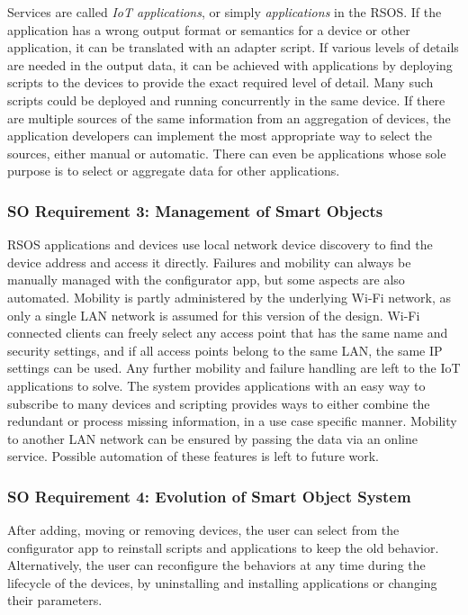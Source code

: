 Services are called \emph{IoT applications}, or simply \emph{applications} in the RSOS.
If the application has a wrong output format or semantics for a device or other application, it can be translated with an adapter script. If various levels of details are needed in the output data, it can be achieved with applications by deploying scripts to the devices to provide the exact required level of detail. Many such scripts could be deployed and running concurrently in the same device. If there are multiple sources of the same information from an aggregation of devices, the application developers can implement the most appropriate way to select the sources, either manual or automatic. There can even be applications whose sole purpose is to select or aggregate data for other applications.

\subsubsection*{SO Requirement 3: Management of Smart Objects}
RSOS applications and devices use local network device discovery to find the device address and access it directly. Failures and mobility can always be manually managed with the configurator app, but some aspects are also automated. Mobility is partly administered by the underlying Wi-Fi network, as only a single LAN network is assumed for this version of the design. Wi-Fi connected clients can freely select any access point that has the same name and security settings, and if all access points belong to the same LAN, the same IP settings can be used. Any further mobility and failure handling are left to the IoT applications to solve. The system provides applications with an easy way to subscribe to many devices and scripting provides ways to either combine the redundant or process missing information, in a use case specific manner. Mobility to another LAN network can be ensured by passing the data via an online service. Possible automation of these features is left to future work.


\subsubsection*{SO Requirement 4: Evolution of Smart Object System}
After adding, moving or removing devices, the user can select from the configurator app to reinstall scripts and applications to keep the old behavior. Alternatively, the user can reconfigure the behaviors at any time during the lifecycle of the devices, by uninstalling and installing applications or changing their parameters.

